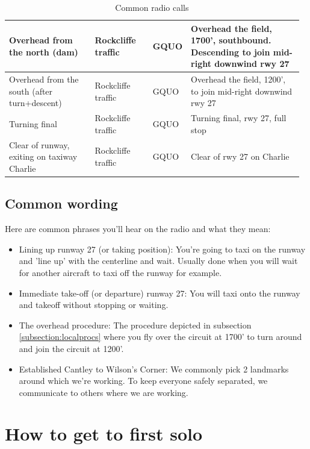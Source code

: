 \documentclass[12pt,letterpaper]{article}
\begin{document}
\begin{table}[]
\begin{tabular}{| p{0.30\linewidth} |  p{0.20\linewidth} | p{0.07\linewidth} |  p{0.40\linewidth} |}
        Overhead from the north (dam) & Rockcliffe traffic & GQUO & Overhead the field, 1700’, southbound. Descending to join mid-right downwind rwy 27\\
        \hline
        
        Overhead from the south (after turn+descent) & Rockcliffe traffic & GQUO & Overhead the field, 1200’, to join mid-right downwind rwy 27\\
        \hline
        
        Turning final & Rockcliffe traffic & GQUO & Turning final, rwy 27, full stop\\
        \hline
        
        Clear of runway, exiting on taxiway Charlie & Rockcliffe traffic & GQUO & Clear of rwy 27 on Charlie\\
        \hline
        
        \end{tabular}
        \hspace*{-1cm}
        \caption{Common radio calls}
        \label{tab:radiocalls}
    \end{table}
    
    \subsection{Common wording}
    Here are common phrases you'll hear on the radio and what they mean:
    \begin{itemize}
        \item Lining up runway 27 (or taking position): You're going to taxi on the runway and 'line up' with the centerline and wait. Usually done when you will wait for another aircraft to taxi off the runway for example.
        \item Immediate take-off (or departure) runway 27: You will taxi onto the runway and takeoff without stopping or waiting. 
        \item The overhead procedure: The procedure depicted in subsection \ref{subsection:localprocs} where you fly over the circuit at 1700' to turn around and join the circuit at 1200'.
        \item Established Cantley to Wilson's Corner: We commonly pick 2 landmarks around which we're working. To keep everyone safely separated, we communicate to others where we are working.
    \end{itemize}

    \newpage
    \section{How to get to first solo}
    
\end{document}
